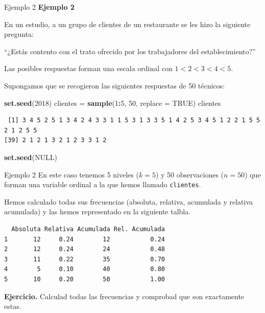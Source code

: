 \documentclass[
  ignorenonframetext,
]{beamer}
\newenvironment{Shaded}{\begin{snugshade}}{\end{snugshade}}
\newcommand{\AttributeTok}[1]{\textcolor[rgb]{0.13,0.29,0.53}{#1}}
\newcommand{\ConstantTok}[1]{\textcolor[rgb]{0.56,0.35,0.01}{#1}}
\newcommand{\DecValTok}[1]{\textcolor[rgb]{0.00,0.00,0.81}{#1}}
\newcommand{\FunctionTok}[1]{\textcolor[rgb]{0.13,0.29,0.53}{\textbf{#1}}}
\newcommand{\NormalTok}[1]{#1}
\newcommand{\OtherTok}[1]{\textcolor[rgb]{0.56,0.35,0.01}{#1}}
\newcommand{\SpecialCharTok}[1]{\textcolor[rgb]{0.81,0.36,0.00}{\textbf{#1}}}
\begin{document}
\begin{frame}[fragile]{Ejemplo 2}
\label{ejemplo-2}
\textbf{Ejemplo 2}

En un estudio, a un grupo de clientes de un restaurante se les hizo la
siguiente pregunta:

``¿Estás contento con el trato ofrecido por los trabajadores del
establecimiento?''

Las posibles respuestas forman una escala ordinal con \(1<2<3<4<5\).

Supongamos que se recogieron las siguientes respuestas de 50 técnicos:

\begin{Shaded}
\begin{Highlighting}[]
\FunctionTok{set.seed}\NormalTok{(}\DecValTok{2018}\NormalTok{)}
\NormalTok{clientes }\OtherTok{=} \FunctionTok{sample}\NormalTok{(}\DecValTok{1}\SpecialCharTok{:}\DecValTok{5}\NormalTok{, }\DecValTok{50}\NormalTok{, }\AttributeTok{replace =} \ConstantTok{TRUE}\NormalTok{)}
\NormalTok{clientes}
\end{Highlighting}
\end{Shaded}

\begin{verbatim}
 [1] 3 4 5 2 5 1 3 4 2 4 3 3 1 1 5 3 1 3 3 5 1 4 2 5 3 4 5 1 2 2 1 5 5 2 1 2 5 5
[39] 2 1 2 1 3 2 1 2 3 3 1 2
\end{verbatim}

\begin{Shaded}
\begin{Highlighting}[]
\FunctionTok{set.seed}\NormalTok{(}\ConstantTok{NULL}\NormalTok{)}
\end{Highlighting}
\end{Shaded}
\end{frame}

\begin{frame}[fragile]{Ejemplo 2}
\label{ejemplo-2-1}
En este caso tenemos 5 niveles (\(k=5\)) y 50 observaciones (\(n=50\))
que forman una variable ordinal a la que hemos llamado
\texttt{clientes}.

Hemos calculado todas sus frecuencias (absoluta, relativa, acumulada y
relativa acumulada) y las hemos representado en la siguiente talbla.

\begin{verbatim}
  Absoluta Relativa Acumulada Rel. Acumulada
1       12     0.24        12           0.24
2       12     0.24        24           0.48
3       11     0.22        35           0.70
4        5     0.10        40           0.80
5       10     0.20        50           1.00
\end{verbatim}

\textbf{Ejercicio.} Calculad todas las frecuencias y comprobad que son
exactamente estas.
\end{frame}
\end{document}
